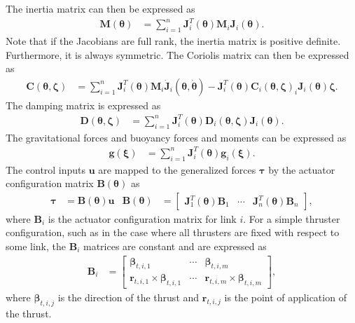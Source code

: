 The inertia matrix
can then be expressed as
\begin{align}
    \bm{M}(\bm{\theta}) &= \sum_{i=1}^{n} \bm{J}_{i}^T(\bm{\theta}) \bm{M}_i \bm{J}_{i}(\bm{\theta}).
\end{align}
Note that if the Jacobians are full rank, the inertia matrix is positive definite.
Furthermore, it is always symmetric. The Coriolis matrix can then be expressed as
\begin{align}
    \bm{C}(\bm{\theta}, \bm{\zeta}) &=
    \sum_{i=1}^{n} \bm{J}_{i}^T(\bm{\theta}) \bm{M}_i \dot{\bm{J}}_{i}(\bm{\theta},\dot{\bm{\theta}})
    -\bm{J}_{i}^T(\bm{\theta}) \bm{C}_i(\bm{\theta},\bm{\zeta})_i \bm{J}_{i}(\bm{\theta}) \bm{\zeta}.
\end{align}
The damping matrix is expressed as
\begin{align}
    \bm{D}(\bm{\theta}, \bm{\zeta}) &=
    \sum_{i=1}^{n} \bm{J}_{i}^T(\bm{\theta}) \bm{D}_i(\bm{\theta},\bm{\zeta}) \bm{J}_{i}(\bm{\theta}).
\end{align}
The gravitational forces and buoyancy forces and moments can be expressed as
\begin{align}
    \bm{g}(\bm{\xi}) &=
    \sum_{i=1}^{n} \bm{J}_{i}^T(\bm{\theta}) \bm{g}_i(\bm{\xi}). \label{eq:modeling:g}
\end{align}
The control inputs $\bm{u}$ are mapped to the generalized forces $\bm{\tau}$ by
the actuator configuration matrix $\bm{B}(\bm{\theta})$ as
\begin{align}
    \label{eq:modeling:Bdef}
    \bm{\tau} &= \bm{B}(\bm{\theta}) \bm{u} &
    \bm{B}(\bm{\theta}) &= \begin{bmatrix}
        \bm{J}_1^T(\bm{\theta}) \bm{B}_1 & \cdots & \bm{J}_n^T(\bm{\theta}) \bm{B}_n
    \end{bmatrix},
\end{align}
where $\bm{B}_i$ is the actuator configuration matrix for link $i$. For a simple
thruster configuration, such as in the case where all thrusters are fixed with
respect to some link, the $\bm{B}_i$ matrices are constant and are expressed
as
\begin{align}
    \bm{B}_i &= \begin{bmatrix}
        \bm{\beta}_{t,i,1} & \cdots & \bm{\beta}_{t,i,m} \\
        \bm{r}_{t,i,1} \times \bm{\beta}_{t,i,1} & \cdots & \bm{r}_{t,i,m} \times \bm{\beta}_{t,i,m}
    \end{bmatrix},
\end{align}
where $\bm{\beta}_{t,i,j}$ is the direction of the thrust and $\bm{r}_{t,i,j}$
is the point of application of the thrust.





